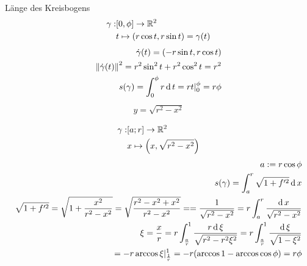 \begin{Bsp}{Länge des Kreisbogens}
  \begin{align*}
    \gamma:&[0,\phi]\to\mathbb{R}^2\\
    &t\mapsto \left( r \cos t, r\sin t \right) = \gamma(t)\\
  \end{align*}
  \begin{align*}
    \dot{\gamma}(t)=\left( -r\sin t, r\cos t \right)\\
    \left\| \dot{\gamma}(t) \right\|^2=r^2\sin^2t+r^2\cos^2t=r^2\\
    s(\gamma)=\int^\phi_0r\operatorname{d} t=rt|^\phi_0=r\phi
  \end{align*}
  \begin{align*}
    y=\sqrt{r^2-x^2}\\
  \end{align*}
  \begin{align*}
    \gamma:&[a;r]\to\mathbb{R}^2\\
    &x\mapsto \left( x,\sqrt{r^2-x^2} \right)
  \end{align*}
  \begin{align*}
    a:=r\cos\phi\\
    s(\gamma)=\int^r_a\sqrt{1+f'^2}\operatorname{d} x\\
    \sqrt{1+f'^2}=\sqrt{1+\frac{x^2}{r^2-x^2}}=\sqrt{\frac{r^2-x^2+x^2}{r^2-x^2}}=
    =\frac{1}{\sqrt{r^2-x^2}} = r\int_a^r\frac{\operatorname{d} x}{\sqrt{r^2-x^2}}\\
    \xi=\frac{x}{r}
    =r\int_{\frac{a}{r}}^1\frac{r\operatorname{d} \xi}{\sqrt{r^2-r^2\xi^2}}=r\int_{\frac{a}{r}}^1\frac{\operatorname{d}\xi}{\sqrt{1-\xi^2}}\\
    =-r\arccos\xi|^1_{\frac{1}{r}}=-r(\arccos 1- \arccos \cos \phi)= r\phi
  \end{align*}
\end{Bsp}
